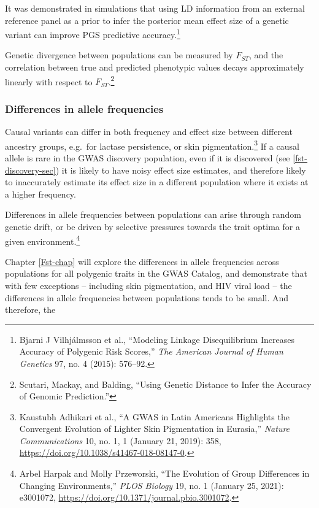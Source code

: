 \documentclass[
]{book}
\begin{document}
It was demonstrated in simulations that using LD information from an external reference panel as a prior to infer the posterior mean effect size of a genetic variant can improve PGS predictive accuracy.\footnote{Bjarni J Vilhjálmsson et al., {``Modeling Linkage Disequilibrium Increases Accuracy of Polygenic Risk Scores,''} \emph{The American Journal of Human Genetics} 97, no. 4 (2015): 576--92.}

Genetic divergence between populations can be measured by \(F_{ST}\), and the correlation between true and predicted phenotypic values decays approximately linearly with respect to \(F_{ST}\).\footnote{Scutari, Mackay, and Balding, {``Using {Genetic Distance} to {Infer} the {Accuracy} of {Genomic Prediction}.''}}

\hypertarget{differences-in-allele-frequencies}{%
\subsubsection{Differences in allele frequencies}\label{differences-in-allele-frequencies}}

Causal variants can differ in both frequency and effect size between different ancestry groups, e.g.~for lactase persistence, or skin pigmentation.\footnote{Kaustubh Adhikari et al., {``A {GWAS} in {Latin Americans} Highlights the Convergent Evolution of Lighter Skin Pigmentation in {Eurasia},''} \emph{Nature Communications} 10, no. 1, 1 (January 21, 2019): 358, \url{https://doi.org/10.1038/s41467-018-08147-0}.} If a causal allele is rare in the GWAS discovery population, even if it is discovered (see \ref{fst-discovery-sec}) it is likely to have noisy effect size estimates, and therefore likely to inaccurately estimate its effect size in a different population where it exists at a higher frequency.

Differences in allele frequencies between populations can arise through random genetic drift, or be driven by selective pressures towards the trait optima for a given environment.\footnote{Arbel Harpak and Molly Przeworski, {``The Evolution of Group Differences in Changing Environments,''} \emph{PLOS Biology} 19, no. 1 (January 25, 2021): e3001072, \url{https://doi.org/10.1371/journal.pbio.3001072}.}

Chapter \ref{Fst-chap} will explore the differences in allele frequencies across populations for all polygenic traits in the GWAS Catalog, and demonstrate that with few exceptions -- including skin pigmentation, and HIV viral load -- the differences in allele frequencies between populations tends to be small. And therefore, the
\end{document}
